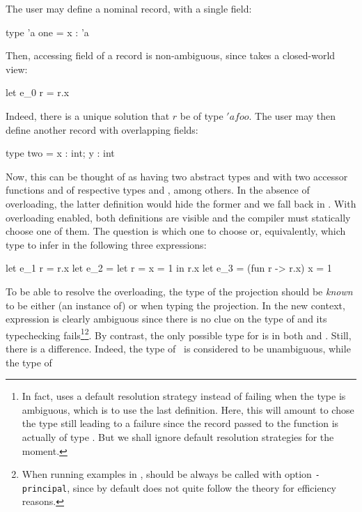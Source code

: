 \documentclass[acmsmall,screen,nonacm]{acmart}
\begin{document}
The user may define a nominal record, with \eg a single field:
\begin{program}[input]
type 'a one = {x : 'a}
\end{program}
Then, accessing field  of a record is non-ambiguous, since
\OCaml takes a closed-world view:
\begin{program}[input]
let e_0 r = r.x
\end{program}
Indeed, there is a unique solution that \ocaml$r$ be of type \ocaml$'a foo$.
The user may then define another record with overlapping fields:
\begin{program}[input]
type two = {x : int; y : int}
\end{program}
Now, this can be thought of as having two abstract types  and
 with two accessor functions  and
 of respective types  and
, among others.
%
In the absence of overloading, the latter definition would hide the former
and we fall back in \ML.  With overloading enabled, both definitions are
visible and the compiler must statically choose one of them.
%
The question is which one to choose or, equivalently, which type to infer
in the following three expressions:
\begin{program}[input]
let e_1 r = r.x
let e_2 = let r = {x = 1} in r.x
let e_3 = (fun r -> r.x) {x = 1}
\end{program}
To be able to resolve the overloading, the type of the projection should be
\emph{known} to be either (an instance of)  or 
when typing the projection.  In the new context, expression
 is clearly ambiguous since there is no clue on the type
of  and its typechecking fails\footnote {In fact, \OCaml uses a
default resolution strategy instead of failing when the type is ambiguous,
which is to use the last definition. Here, this will amount to chose the
type  still leading to a failure since the record passed to the
function is actually of type . But we shall ignore default
resolution strategies for the moment.}\footnote {When running examples in
\OCaml,
\OCaml should be always be called with option \texttt{-principal}, since by
default \OCaml does not quite follow the theory for efficiency reasons.}.
%
By contrast, the only possible type for  is  in both
 and .  Still, there is a difference.  Indeed, the
type of~ is considered to be unambiguous, while the type of
\end{document}
